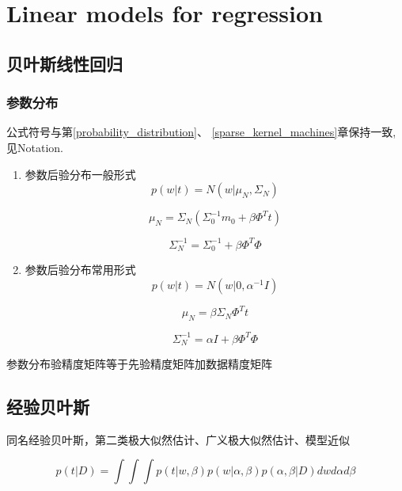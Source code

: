 \chapter{Linear models for regression}
\label{linear_models_regression}
\section{贝叶斯线性回归}
\subsection{参数分布}
公式符号与第\ref{probability_distribution}、
\ref{sparse_kernel_machines}章保持一致, 见Notation.

\begin{enumerate}
\item 参数后验分布一般形式
\begin{equation}
p(w|t) = N(w|\mu_N, \Sigma_N)
\end{equation}

\begin{equation}
\mu_N = \Sigma_N(\Sigma_0^{-1}m_0 + \beta \Phi^Tt)
\end{equation}

\begin{equation}
\Sigma_N^{-1} = \Sigma_0^{-1} + \beta\Phi^T\Phi
\end{equation}

\item 参数后验分布常用形式
\begin{equation}
p(w|t) = N(w|0, \alpha^{-1}I)
\end{equation}

\begin{equation}
\mu_N = \beta \Sigma_N\Phi^Tt 
\end{equation}

\begin{equation}
\Sigma_N^{-1} = \alpha I + \beta \Phi^T\Phi
\end{equation}

\end{enumerate}
参数分布验精度矩阵等于先验精度矩阵加数据精度矩阵

\section{经验贝叶斯}
同名经验贝叶斯，第二类极大似然估计、广义极大似然估计、模型近似

\begin{equation}
p(t|D) = \int\int\int p(t|w, \beta)p(w|\alpha, \beta)
p(\alpha,\beta|D)dwd\alpha d\beta
\end{equation}

